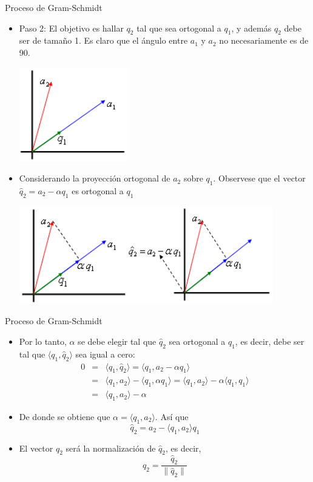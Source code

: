 \documentclass{beamer}
\begin{document}
 \begin{frame}{Proceso de Gram-Schmidt}
 \begin{itemize}
  \item<1-> Paso 2: El objetivo es hallar $q_2$ tal que sea ortogonal a $q_1$, y adem\'as $q_2$ debe ser de tama\~no 1.  Es claro que el \'angulo entre $a_1$ y $a_2$ no necesariamente es de 90.
  \begin{center}
  \includegraphics[scale=0.5]{gs_p2_a.png}
 \end{center}
 \item<2-> Considerando la proyecci\'on ortogonal de $a_2$ sobre $q_1$. Observese que el vector $\hat q_2=a_2-\alpha q_1$ es ortogonal a $q_1$
  \begin{center}
  \includegraphics[scale=0.5]{gs_p2_b.png}
 \end{center}
 \end{itemize} 
 \end{frame}
 \begin{frame}{Proceso de Gram-Schmidt}
  \begin{itemize}
   \item Por lo tanto, $\alpha$ se debe elegir tal que $\hat q_2$ sea ortogonal a $q_1$, es 
 decir, debe ser tal que $\langle q_1,\hat q_2\rangle$ sea igual a cero:
   \begin{eqnarray}
    \nonumber 0 & = & \langle q_1,\hat q_2\rangle = \langle q_1,a_2-\alpha q_1\rangle \\
   \nonumber  & = & \langle q_1,a_2 \rangle - \langle q_1,\alpha q_1\rangle = \langle q_1,a_2 \rangle - \alpha \langle q_1,q_1\rangle\\
    \nonumber & = & \langle q_1,a_2 \rangle - \alpha 
   \end{eqnarray}
  \item<2-> De donde se obtiene que $\alpha=\langle q_1,a_2\rangle$.  As\'i que
  $$
  \hat q_2 = a_2 - \langle q_1,a_2\rangle q_1
  $$
  \item<3-> El vector $q_2$ ser\'a la normalizaci\'on de $\hat q_2$, es decir,
  $$
  q_2 = \frac{\hat q_2}{\|\hat q_2\|}
  $$
  \end{itemize}
 \end{frame}
\end{document}
